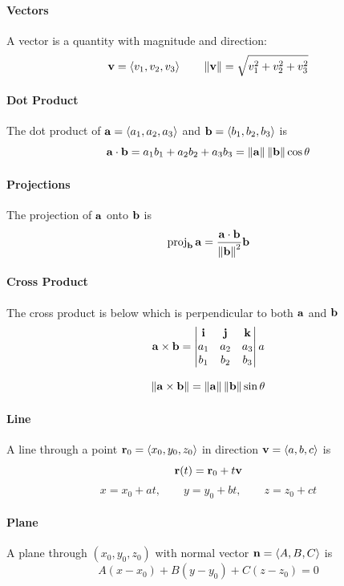 \documentclass[oneside]{book}
\begin{document}
\paragraph{Vectors} A vector is a quantity with magnitude and direction:
\[
    \mathbf{v}=\langle v_1,v_2,v_3\rangle \qquad \left\lVert \mathbf{v} \right\rVert=\sqrt{v_1^2+v_2^2+v_3^2}
\]

\paragraph{Dot Product}

The dot product of $\mathbf{a}=\langle a_1,a_2,a_3\rangle$ and $\mathbf{b}=\langle b_1,b_2,b_3\rangle$ is
\[
    \mathbf{a}\cdot\mathbf{b}=a_1b_1+a_2b_2+a_3b_3 = \left\lVert \mathbf{a} \right\rVert\left\lVert \mathbf{b} \right\rVert\cos\theta
\]

\paragraph{Projections} The projection of $\mathbf{a}$ onto $\mathbf{b}$ is
\[
    \operatorname{proj}_{\mathbf{b}}\mathbf{a}
    =\frac{\mathbf{a}\cdot\mathbf{b}}{\left\lVert \mathbf{b} \right\rVert^2}\mathbf{b}
\]

\paragraph{Cross Product} The cross product is below which is perpendicular to both $\mathbf{a}$ and $\mathbf{b}$
\[
    \mathbf{a}\times \mathbf{b}
    =\begin{vmatrix}
    \mathbf{i} & \mathbf{j} & \mathbf{k}\\
    a_1 & a_2 & a_3\\
    b_1 & b_2 & b_3
    \end{vmatrix}a
\]

\[
    \left\lVert \mathbf{a}\times\mathbf{b} \right\rVert=\left\lVert \mathbf{a} \right\rVert\left\lVert \mathbf{b} \right\rVert\sin\theta
\]



\paragraph{Line} A line through a point $\mathbf{r}_0=\langle x_0,y_0,z_0\rangle$ in direction $\mathbf{v}=\langle a,b,c\rangle$ is
\[
    \mathbf{r}(t)=\mathbf{r}_0+t\mathbf{v}
\]
\[
    x=x_0+at,
    \qquad y=y_0+bt,
    \qquad z=z_0+ct
\]

\paragraph{Plane} A plane through $(x_0,y_0,z_0)$ with normal vector $\mathbf{n}=\langle A,B,C\rangle$ is
\[
    A(x-x_0)+B(y-y_0)+C(z-z_0)=0
\]
\end{document}
